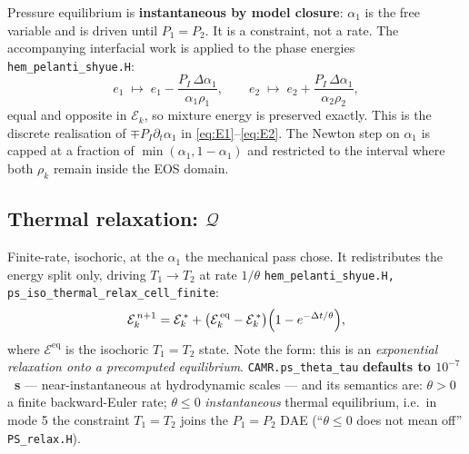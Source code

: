 \documentclass[11pt,a4paper]{article}
\newcommand{\code}[1]{\texttt{\small #1}}
\newcommand{\src}[1]{{\color{gray}\code{#1}}}
\begin{document}
Pressure equilibrium is \textbf{instantaneous by model closure}: $\alpha_1$ is
the free variable and is driven until $P_1=P_2$.  It is a constraint, not a
rate.  The accompanying interfacial work is applied to the phase energies
\src{hem\_pelanti\_shyue.H}:
\begin{equation}
  e_1 \;\mapsto\; e_1 - \frac{P_{\!I}\,\Delta\alpha_1}{\alpha_1\rho_1},
  \qquad
  e_2 \;\mapsto\; e_2 + \frac{P_{\!I}\,\Delta\alpha_1}{\alpha_2\rho_2},
  \label{eq:mechwork}
\end{equation}
equal and opposite in $\mathcal{E}_k$, so mixture energy is preserved
exactly.  This is the discrete realisation of $\mp P_{\!I}\partial_t\alpha_1$
in \eqref{eq:E1}--\eqref{eq:E2}.  The Newton step on $\alpha_1$ is capped at a
fraction of $\min(\alpha_1,1-\alpha_1)$ and restricted to the interval where
both $\rho_k$ remain inside the EOS domain.

\subsection{Thermal relaxation: $\mathcal{Q}$}

Finite-rate, isochoric, at the $\alpha_1$ the mechanical pass chose.  It
redistributes the energy split only, driving $T_1\!\to\!T_2$ at rate
$1/\theta$ \src{hem\_pelanti\_shyue.H, ps\_iso\_thermal\_relax\_cell\_finite}:
\begin{equation}
  \mathcal{E}_k^{\,n+1}
    = \mathcal{E}_k^{\,*}
    + \bigl(\mathcal{E}_k^{\,\mathrm{eq}}-\mathcal{E}_k^{\,*}\bigr)
      \Bigl(1-e^{-\Delta t/\theta}\Bigr),
  \label{eq:thermal}
\end{equation}
where $\mathcal{E}^{\mathrm{eq}}$ is the isochoric $T_1\!=\!T_2$ state.  Note
the form: this is an \emph{exponential relaxation onto a precomputed
equilibrium}.  \code{CAMR.ps\_theta\_tau} \textbf{defaults to
$10^{-7}$~s} --- near-instantaneous at
hydrodynamic scales --- and its semantics are: $\theta>0$ a finite
backward-Euler rate; $\theta\le0$ \emph{instantaneous} thermal
equilibrium, i.e.\ in mode 5 the constraint $T_1\!=\!T_2$ joins the
$P_1\!=\!P_2$ DAE (``$\theta\le0$ does not mean off''
\src{PS\_relax.H}).
\end{document}
